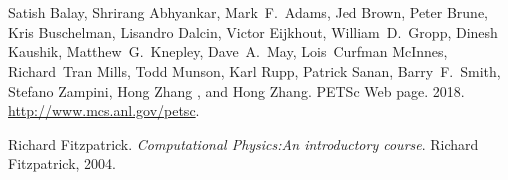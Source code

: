 \documentclass{article}
\newcommand{\tmtextit}[1]{{\itshape{#1}}}
\begin{document}
\

\

\begin{thebibliography}{1}
  Satish Balay, Shrirang Abhyankar, Mark~F.~Adams,
  Jed Brown, Peter Brune, Kris Buschelman, Lisandro Dalcin, Victor Eijkhout,
  William~D.~Gropp, Dinesh Kaushik, Matthew~G.~Knepley, Dave~A.~May,
  Lois~Curfman McInnes, Richard~Tran Mills, Todd Munson, Karl Rupp, Patrick
  Sanan, Barry~F.~Smith, Stefano Zampini, Hong Zhang , and  Hong
  Zhang.{\newblock} PETSc Web page.{\newblock} 2018.{\newblock}
  \url{http://www.mcs.anl.gov/petsc}.{\newblock}
  
  Richard Fitzpatrick.{\newblock}
  \tmtextit{Computational Physics:An introductory course}.{\newblock} Richard
  Fitzpatrick, 2004.{\newblock}
\end{thebibliography}

\
\end{document}
